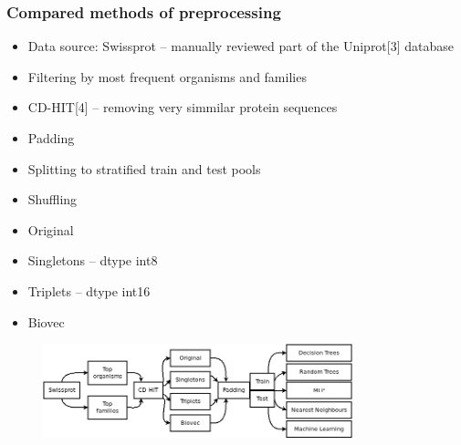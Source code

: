 \documentclass[10pt]{beamer}
\begin{document}
\begin{frame}
\frametitle{Compared methods of preprocessing}
\begin{itemize}
\item Data source: Swissprot -- manually reviewed part of the Uniprot[3] database
\item Filtering by most frequent organisms and families
\item CD-HIT[4] -- removing very simmilar protein sequences
\item Padding
\item Splitting to stratified train and test pools
\item Shuffling
\end{itemize}

\begin{itemize}
\item Original
\item Singletons -- dtype int8
\item Triplets -- dtype int16
\item Biovec
\end{itemize}
\begin{figure}[H]
\begin{center}
\includegraphics[width=0.8\textwidth]{workflow}
\end{center}
\end{figure}
\end{frame}
\end{document}
